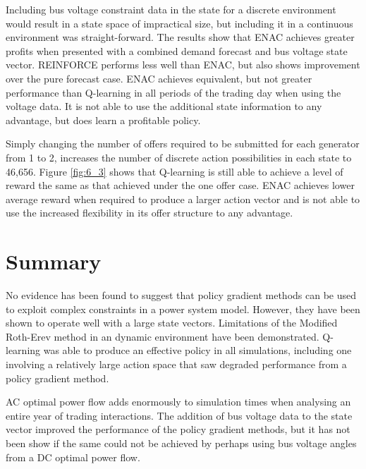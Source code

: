 Including bus voltage constraint data in the state for a discrete environment
would result in a state space of impractical size, but including it in a
continuous environment was straight-forward.  The results show that ENAC
achieves greater profits when presented with a combined demand forecast and bus
voltage state vector.  REINFORCE performs less well than ENAC, but also shows
improvement over the pure forecast case.  ENAC achieves equivalent, but not
greater performance than Q-learning in all periods of the trading day when
using the voltage data.  It is not able to use the additional state information
to any advantage, but does learn a profitable policy.

Simply changing the number of offers required to be submitted for each generator
from 1 to 2, increases the number of discrete action possibilities in each state to
46,656.  Figure \ref{fig:6_3} shows that Q-learning is still able to achieve a
level of reward the same as that achieved under the one offer case.  ENAC
achieves lower average reward when required to produce a larger action vector
and is not able to use the increased flexibility in its offer structure to any
advantage.

\section{Summary}
No evidence has been found to suggest that policy gradient methods can be used
to exploit complex constraints in a power system model.  However, they have been
shown to operate well with a large state vectors.  Limitations of the Modified
Roth-Erev method in an dynamic environment have been demonstrated.  Q-learning
was able to produce an effective policy in all simulations, including one
involving a relatively large action space that saw degraded performance from a
policy gradient method.

AC optimal power flow adds enormously to simulation times when analysing an
entire year of trading interactions.  The addition of bus voltage data to the
state vector improved the performance of the policy gradient methods, but it has
not been show if the same could not be achieved by perhaps using bus voltage
angles from a DC optimal power flow.
